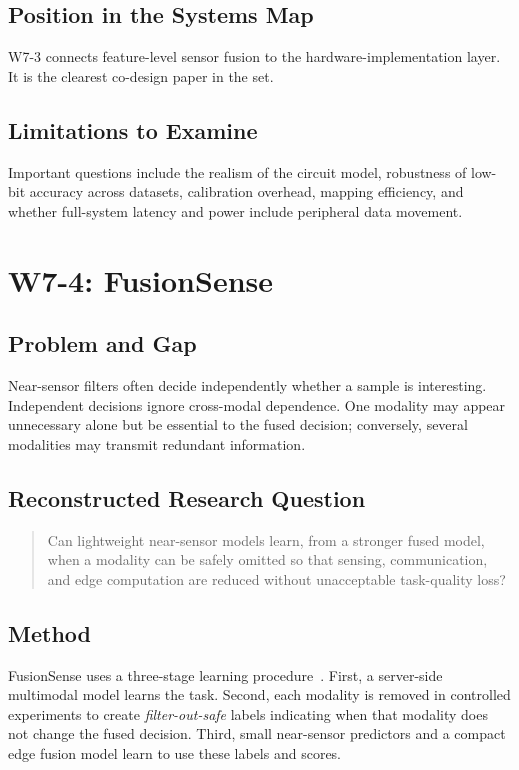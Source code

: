 \subsection{Position in the Systems Map}

W7-3 connects feature-level sensor fusion to the hardware-implementation layer. It is the clearest co-design paper in the set.

\subsection{Limitations to Examine}

Important questions include the realism of the circuit model, robustness of low-bit accuracy across datasets, calibration overhead, mapping efficiency, and whether full-system latency and power include peripheral data movement.

\section{W7-4: FusionSense}

\subsection{Problem and Gap}

Near-sensor filters often decide independently whether a sample is interesting. Independent decisions ignore cross-modal dependence. One modality may appear unnecessary alone but be essential to the fused decision; conversely, several modalities may transmit redundant information.

\subsection{Reconstructed Research Question}

\begin{quote}
Can lightweight near-sensor models learn, from a stronger fused model, when a modality can be safely omitted so that sensing, communication, and edge computation are reduced without unacceptable task-quality loss?
\end{quote}

\subsection{Method}

FusionSense uses a three-stage learning procedure~\cite{yun2026fusionsense}. First, a server-side multimodal model learns the task. Second, each modality is removed in controlled experiments to create \emph{filter-out-safe} labels indicating when that modality does not change the fused decision. Third, small near-sensor predictors and a compact edge fusion model learn to use these labels and scores.

